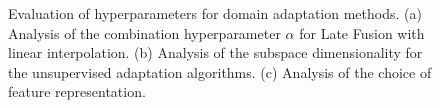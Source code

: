 \begin{figure}
\centering
{}
\caption{Evaluation of hyperparameters for domain adaptation methods. (a) Analysis of the combination hyperparameter $\alpha$ for Late Fusion with linear interpolation. (b) Analysis of the subspace dimensionality for the unsupervised adaptation algorithms. (c) Analysis of the choice of feature representation.}
\label{fig:hyperparam-eval}
\end{figure}
